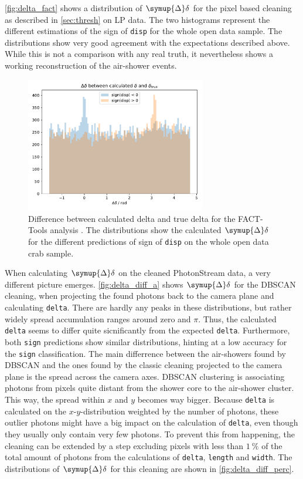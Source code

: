 \autoref{fig:delta_fact} shows a distribution of $\symup{\Delta}\delta$ for
the pixel based cleaning as described in \autoref{sec:thresh} on LP data.
The two histograms represent the different estimations of the sign of
\texttt{disp} for the whole open data sample. The distributions show very
good agreement with the expectations described above. While this is not a
comparison with any real truth, it nevertheless shows a working
reconstruction of the air-shower events.
%
\begin{figure}
  \centering
  \includegraphics[width=0.7\textwidth]{Plots/delta_delta/delta_delta_facttools.pdf}
  \caption{Difference between calculated delta and true delta for the FACT-Tools analysis \cite{openana}. The distributions show the calculated $\symup{\Delta}\delta$ for the different predictions of sign of \texttt{disp} on the whole open data crab sample.}
  \label{fig:delta_fact}
\end{figure}
%
When calculating $\symup{\Delta}\delta$ on the cleaned PhotonStream data, a
very different picture emerges. \autoref{fig:delta_diff_a} shows
$\symup{\Delta}\delta$ for the DBSCAN cleaning, when projecting the found
photons back to the camera plane and calculating \texttt{delta}. There are
hardly any peaks in these distributions, but rather widely spread
accumulation ranges around zero and $\pi$. Thus, the calculated
\texttt{delta} seems to differ quite sicnificantly from the expected
\texttt{delta}. Furthermore, both \texttt{sign} predictions show similar
distributions, hinting at a low accuracy for the \texttt{sign}
classification. The main differrence between the air-showers found by DBSCAN
and the ones found by the classic cleaning projected to the camera plane is
the spread across the camera axes. DBSCAN clustering is associating photons
from pixels quite distant from the shower core to the air-shower cluster.
This way, the spread within $x$ and $y$ becomes way bigger. Because
\texttt{delta} is calculated on the $x$-$y$-distribution weighted by the
number of photons, these outlier photons might have a big impact on the
calculation of \texttt{delta}, even though they usually only contain very
few photons. To prevent this from happening, the cleaning can be extended by
a step excluding pixels with less than $\SI{1}{\percent}$ of the total
amount of photons from the calculations of \texttt{delta}, \texttt{length}
and \texttt{width}. The distributions of $\symup{\Delta}\delta$ for this
cleaning are shown in \autoref{fig:delta_diff_perc}.


